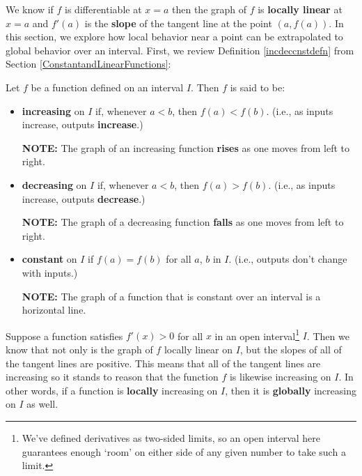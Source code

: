 \documentclass{ximera}
\begin{document}
	\author{Stitz-Zeager}




\setcounter{footnote}{0}

\label{AppDerivatives}

We know if $f$ is differentiable at $x=a$ then the graph of  $f$ is \textbf{locally linear} at $x=a$ and $f'(a)$ is the \textbf{slope} of the tangent line at the point $(a, f(a))$.  In this section, we explore how local behavior near a point can be extrapolated to global behavior over an interval.  First, we review Definition \ref{incdeccnstdefn} from Section \ref{ConstantandLinearFunctions}:




\begin{defnrecall}

Let $f$ be a function defined on an interval $I$.  Then $f$ is said to be:

\begin{itemize}

\item  \textbf{increasing} on $I$ if, whenever $a < b$, then $f(a) < f(b)$.   (i.e., as inputs increase, outputs \textbf{increase}.)

\textbf{NOTE:}  The graph of an increasing function  \textbf{rises} as one moves from left to right.

\item  \textbf{decreasing} on $I$ if, whenever $a < b$, then $f(a) > f(b)$.  (i.e., as inputs increase, outputs \textbf{decrease}.)

\textbf{NOTE:}  The graph of a decreasing function \textbf{falls} as one moves from left to right.

\item  \textbf{constant} on $I$ if $f(a) = f(b)$ for all $a$, $b$ in $I$.  (i.e., outputs don't change with inputs.)

\textbf{NOTE:}  The graph of a function that is constant over an interval is a horizontal line.

\end{itemize}

\end{defnrecall}





Suppose a function satisfies $f'(x)  > 0$ for all $x$ in an open interval\footnote{We've defined derivatives  as two-sided limits, so an open interval here guarantees enough `room' on either side of any given number to take such a limit.} $I$.   Then we know that not only is the graph of $f$ locally linear on $I$, but the slopes of all of the tangent lines are positive.  This means that all of the tangent lines are increasing so it stands to reason that the function $f$ is likewise increasing on $I$. In other words, if a function is \textbf{locally} increasing on $I$,  then it is \textbf{globally} increasing on $I$ as well.
\end{document}
